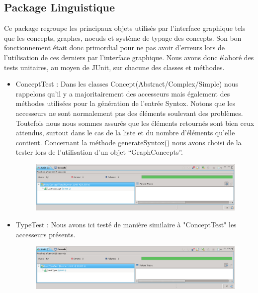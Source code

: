 \documentclass[12pt]{report}
\begin{document}
\subsection{Package Linguistique}
Ce package regroupe les principaux objets utilisés par l'interface graphique tels que les concepts, graphes, noeuds et système de typage des concepts. Son bon fonctionnement était donc primordial pour ne pas avoir d'erreurs lors de l'utilisation de ces derniers par l'interface graphique. Nous avons donc élaboré des tests unitaires, au moyen de JUnit, sur chacune des classes et méthodes. 
\begin{itemize}	
\item ConceptTest : Dans les classes Concept(Abstract/Complex/Simple) nous rappelons qu'il y a majoritairement des accesseurs mais également des méthodes utilisées pour la génération de l'entrée Syntox. Notons que les accesseurs ne sont normalement pas des éléments soulevant des problèmes. Toutefois nous nous sommes assurés que les éléments retournés sont bien ceux attendus, surtout dans le cas de la liste et du nombre d'éléments qu'elle contient.
Concernant la méthode generateSyntox() nous avons choisi de la tester lors de l'utilisation d'un objet ``GraphConcepts''.
\begin{figure}
\begin{center}
	\includegraphics[scale=0.40]{resultatTest1.png}
\end{center}
\end{figure}
\item TypeTest : Nous avons ici testé de manière similaire à "ConceptTest" les accesseurs présents. 
\begin{figure}[h!]
\begin{center}
	\includegraphics[scale=0.40]{resultatTest6.png}
\end{center}
\end{figure}

\end{itemize}
\end{document}
